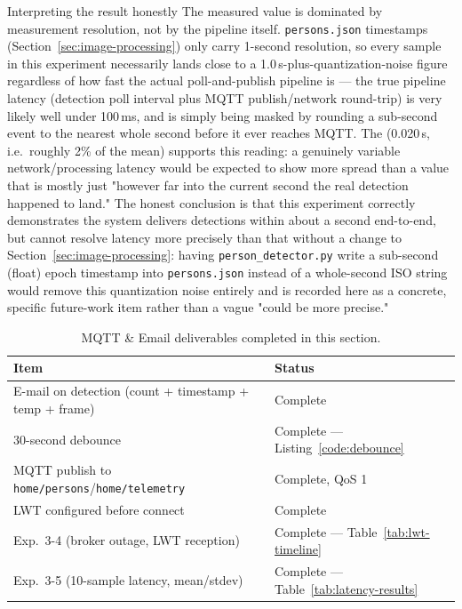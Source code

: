 \begin{answersection}{Interpreting the result honestly}
\alert{The measured value is dominated by measurement resolution, not by
the pipeline itself.} \texttt{persons.json} timestamps
(Section~\ref{sec:image-processing}) only carry 1-second resolution, so
every sample in this experiment necessarily lands close to a
1.0\,s-plus-quantization-noise figure regardless of how fast the actual
poll-and-publish pipeline is --- the true pipeline latency (detection
poll interval plus MQTT publish/network round-trip) is very likely well
under 100\,ms, and is simply being masked by rounding a sub-second event
to the nearest whole second before it ever reaches MQTT. The
 (0.020\,s, i.e.\ roughly 2\% of
the mean) supports this reading: a genuinely variable network/processing
latency would be expected to show more spread than a value that is
mostly just "however far into the current second the real detection
happened to land." The honest conclusion is that this experiment
correctly demonstrates the system delivers detections within about a
second end-to-end, but cannot resolve latency more precisely than that
without a change to Section~\ref{sec:image-processing}: having
\texttt{person\_detector.py} write a sub-second (float) epoch timestamp
into \texttt{persons.json} instead of a whole-second ISO string would
remove this quantization noise entirely and is recorded here as a
concrete, specific future-work item rather than a vague "could be more
precise."
\end{answersection}


\begin{table}[H]
\centering
\caption{MQTT \& Email deliverables completed in this section.}
\label{tab:mqtt-email-summary}
\begin{tabular}{ll}
\toprule
\textbf{Item} & \textbf{Status} \\
\midrule
E-mail on detection (count + timestamp + temp + frame) & Complete \\
30-second debounce & Complete --- Listing~\ref{code:debounce} \\
MQTT publish to \texttt{home/persons}/\texttt{home/telemetry} & Complete, QoS 1 \\
LWT configured before connect & Complete \\
Exp.\ 3-4 (broker outage, LWT reception) & Complete --- Table~\ref{tab:lwt-timeline} \\
Exp.\ 3-5 (10-sample latency, mean/stdev) & Complete --- Table~\ref{tab:latency-results} \\
\bottomrule
\end{tabular}
\end{table}
